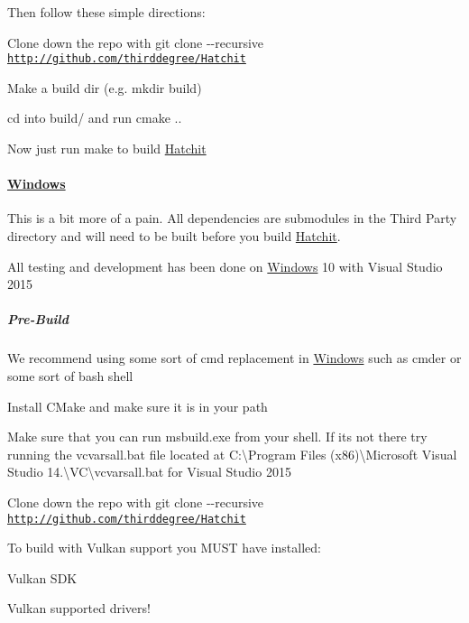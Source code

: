 Then follow these simple directions\+:
\begin{DoxyItemize}
\item Clone down the repo with {\ttfamily git clone -\/-\/recursive \href{http://github.com/thirddegree/Hatchit}{\tt http\+://github.\+com/thirddegree/\+Hatchit}}
\item Make a build dir (e.\+g. mkdir build)
\item cd into build/ and run cmake ..
\item Now just run make to build \hyperlink{namespaceHatchit}{Hatchit}
\end{DoxyItemize}

\paragraph*{\hyperlink{namespaceWindows}{Windows}}

This is a bit more of a pain. All dependencies are submodules in the Third Party directory and will need to be built before you build \hyperlink{namespaceHatchit}{Hatchit}.

All testing and development has been done on \hyperlink{namespaceWindows}{Windows} 10 with Visual Studio 2015

\subparagraph*{Pre-\/\+Build}

We recommend using some sort of cmd replacement in \hyperlink{namespaceWindows}{Windows} such as cmder or some sort of bash shell
\begin{DoxyItemize}
\item Install C\+Make and make sure it is in your path
\item Make sure that you can run {\ttfamily msbuild.\+exe} from your shell. If it\textquotesingle{}s not there try running the {\ttfamily vcvarsall.\+bat} file located at {\ttfamily C\+:\textbackslash{}Program Files (x86)\textbackslash{}Microsoft Visual Studio 14.\textbackslash{}VC\textbackslash{}vcvarsall.\+bat} for Visual Studio 2015
\item Clone down the repo with {\ttfamily git clone -\/-\/recursive \href{http://github.com/thirddegree/Hatchit}{\tt http\+://github.\+com/thirddegree/\+Hatchit}}
\end{DoxyItemize}

To build with Vulkan support you M\+U\+ST have installed\+:
\begin{DoxyItemize}
\item Vulkan S\+DK
\item Vulkan supported drivers!
\end{DoxyItemize}

